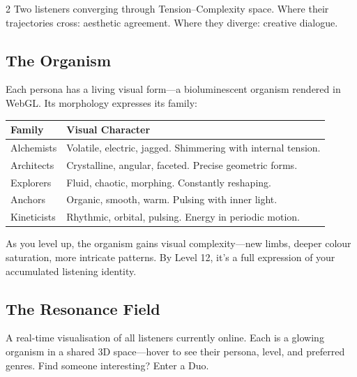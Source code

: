 \documentclass[10pt,a4paper]{article}
\begin{document}
\begin{multicols}{2}
{\scriptsize\color{stone} Two listeners converging through Tension--Complexity space. Where their trajectories cross: aesthetic agreement. Where they diverge: creative dialogue.}

\columnbreak

\subsection{The Organism}

Each persona has a living visual form---a bioluminescent organism rendered in WebGL. Its morphology expresses its family:

\vspace{4pt}
{\small
\begin{tabular}{@{}p{2cm}p{4.5cm}@{}}
  \toprule
  \textbf{\sffamily Family} & \textbf{\sffamily Visual Character} \\
  \midrule
  \textcolor{alch}{\sffamily Alchemists} &
    Volatile, electric, jagged. Shimmering with internal tension. \\[3pt]
  \textcolor{arch}{\sffamily Architects} &
    Crystalline, angular, faceted. Precise geometric forms. \\[3pt]
  \textcolor{expl}{\sffamily Explorers} &
    Fluid, chaotic, morphing. Constantly reshaping. \\[3pt]
  \textcolor{anch}{\sffamily Anchors} &
    Organic, smooth, warm. Pulsing with inner light. \\[3pt]
  \textcolor{kine}{\sffamily Kineticists} &
    Rhythmic, orbital, pulsing. Energy in periodic motion. \\
  \bottomrule
\end{tabular}
}

\vspace{6pt}

As you level up, the organism gains visual complexity---new limbs, deeper colour saturation, more intricate patterns. By Level 12, it's a full expression of your accumulated listening identity.

\subsection{The Resonance Field}

A real-time visualisation of all listeners currently online. Each is a glowing organism in a shared 3D space---hover to see their persona, level, and preferred genres. Find someone interesting? Enter a Duo.

\end{multicols}
\end{document}
